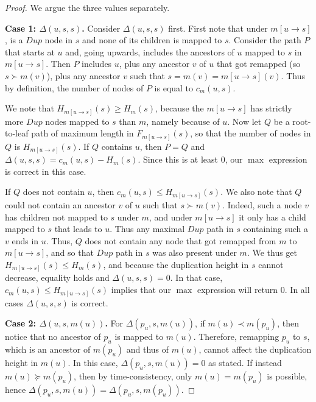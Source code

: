 \documentclass[10pt]{article}
\begin{document}
\begin{proof}
    We argue the three values separately.

    \noindent
    \textbf{Case 1: $\Delta(u, s, s)$.}
    Consider $\Delta(u, s, s)$ first.  
    First note that under $m[u \rightarrow s]$, is a $Dup$ node in $s$ and none of its children is mapped to $s$.  
    Consider the path $P$ that starts at $u$ and, going upwards, includes the ancestors of $u$ mapped to $s$ in $m[u \rightarrow s]$.
    Then $P$ includes $u$, plus any ancestor $v$ of $u$ that got remapped (so $s \succ m(v)$), plus any ancestor $v$ such that $s = m(v) = m[u \rightarrow s](v)$.  Thus by definition, the number of nodes of $P$ is equal to $c_m(u, s)$.

    We note that $H_{m[u \rightarrow s]}(s) \geq H_m(s)$, because the $m[u \rightarrow s]$ has strictly more $Dup$ nodes mapped to $s$ than $m$, namely because of $u$.  
    Now let $Q$ be a root-to-leaf path of maximum length in $F_{m[u \rightarrow s]}(s)$, so that the number of nodes in $Q$ is $H_{m[u \rightarrow s]}(s)$.  
    If $Q$ contains $u$, then $P = Q$ and 
    $\Delta(u, s, s) = c_m(u, s) - H_m(s)$.  Since this is at least $0$, our $\max$ expression is correct in this case.
   
    If $Q$ does not contain $u$, then $c_m(u, s) \leq H_{m[u \rightarrow s]}(s)$.  We also note that $Q$ could not contain an ancestor $v$ of $u$ such that $s \succ m(v)$.  Indeed, such a node $v$ has children not mapped to $s$ under $m$, and under $m[u \rightarrow s]$ it only has a child mapped to $s$ that leads to $u$.  Thus any maximal $Dup$ path in $s$ containing such a $v$ ends in $u$.
    Thus, $Q$ does not contain any node that got remapped from $m$ to $m[u \rightarrow s]$, and so that $Dup$ path in $s$ was also present under $m$.
    We thus get $H_{m[u \rightarrow s]}(s) \leq H_m(s)$, and because the duplication height in $s$ cannot decrease, equality holds and $\Delta(u, s, s) = 0$.  In that case, $c_m(u, s) \leq H_{m[u \rightarrow s]}(s)$ implies that our $\max$ expression will return $0$.  In all cases $\Delta(u, s, s)$ is correct.
    
 

    \medskip

    \noindent
    \textbf{Case 2: $\Delta(u, s, m(u))$.}
    For $\Delta(p_u, s, m(u))$, if $m(u) \prec m(p_u)$, then notice that no ancestor of $p_u$ is mapped to $m(u)$.  Therefore, remapping $p_u$ to $s$, which is an ancestor of $m(p_u)$ and thus of $m(u)$, cannot affect the duplication height in $m(u)$.  In this case, $\Delta(p_u, s, m(u)) = 0$ as stated.
    If instead $m(u) \succeq m(p_u)$, then by time-consistency, only $m(u) = m(p_u)$ is possible, hence $\Delta(p_u, s, m(u)) = \Delta(p_u, s, m(p_u))$.


\end{proof}
\end{document}
